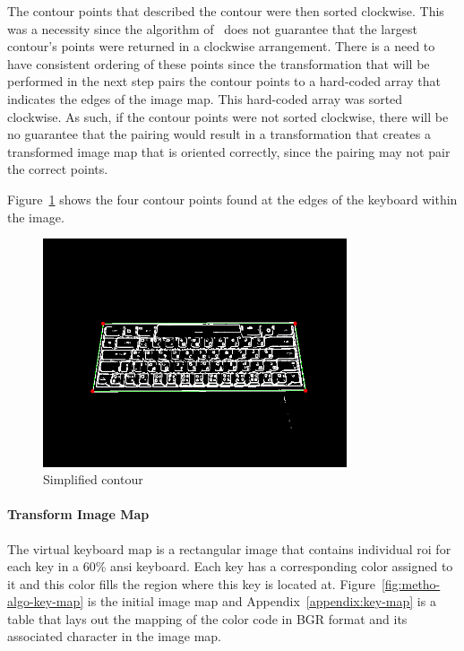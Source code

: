\documentclass{report}
\begin{document}
The contour points that described the contour were then sorted clockwise. This
was a necessity since the algorithm of~\textcite{contours} does not guarantee
that the largest contour's points were returned in a clockwise arrangement.
There is a need to have consistent ordering of these points since the
transformation that will be performed in the next step pairs the contour points
to a hard-coded array that indicates the edges of the image map. This hard-coded
array was sorted clockwise. As such, if the contour points were not sorted
clockwise, there will be no guarantee that the pairing would result in a
transformation that creates a transformed image map that is oriented correctly,
since the pairing may not pair the correct points.

Figure~\ref{fig:metho-algo-largest-contour} shows the four contour points found
at the edges of the keyboard within the image.

\begin{figure}[H]
	\centering
	\includegraphics[width=0.8\textwidth]{get-largest-contour.png}
	\caption{Simplified contour}
	\label{fig:metho-algo-largest-contour}
	\centering
\end{figure}


\paragraph{Transform Image Map}
The virtual keyboard map is a rectangular image that contains individual
\ac{roi} for each key in a 60\% \ac{ansi} keyboard. Each key has a corresponding
color assigned to it and this color fills the region where this key is located
at. Figure~\ref{fig:metho-algo-key-map} is the initial image map and
Appendix~\ref{appendix:key-map} is a table that lays out the mapping of the
color code in BGR format and its associated character in the image map.
\end{document}
